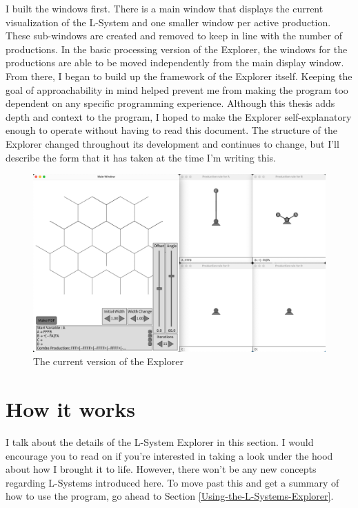 \documentclass[12pt,twoside]{reedthesis}
\begin{document}
	I built the windows first. There is a main window that displays the current visualization of the L-System and one smaller window per active production. These sub-windows are created and removed to keep in line with the number of productions. In the basic processing version of the Explorer, the windows for the productions are able to be moved independently from the main display window. From there, I began to build up the framework of the Explorer itself. Keeping the goal of approachability in mind helped prevent me from making the program too dependent on any specific programming experience. Although this thesis adds depth and context to the program, I hoped to make the Explorer self-explanatory enough to operate without having to read this document. The structure of the Explorer changed throughout its development and continues to change, but I'll describe the form that it has taken at the time I'm writing this.
	
		
	\begin{figure}[h]
	\centering
	\includegraphics[scale=0.3]{Images/CurrentExplorer}
	\caption{The current version of the Explorer}
	\label {CurrentExplorer}
	\end{figure}
	
\section{How it works}

	I talk about the details of the L-System Explorer in this section. I would encourage you to read on if you're interested in taking a look under the hood about how I brought it to life. However, there won't be any new concepts regarding L-Systems introduced here. To move past this and get a summary of how to use the program, go ahead to Section \ref{Using-the-L-Systems-Explorer}.
	
\end{document}
